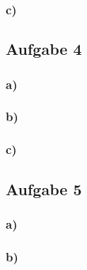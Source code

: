 \documentclass[11pt]{article}
\begin{document}
\subsubsection*{c)}

\subsection*{Aufgabe 4}

\subsubsection*{a)}

\subsubsection*{b)}

\subsubsection*{c)}

\subsection*{Aufgabe 5}

\subsubsection*{a)}

\subsubsection*{b)}
\end{document}
